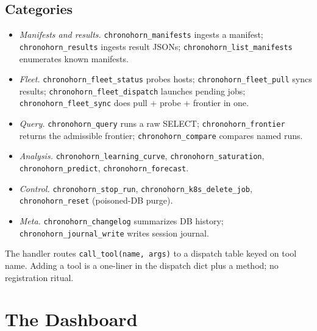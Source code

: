 \documentclass[11pt,openany]{book}
\theoremstyle{definition}
\theoremstyle{plain}
\begin{document}
\section{Categories}

\begin{itemize}
  \item \emph{Manifests and results.}
    \texttt{chronohorn\_manifests} ingests a manifest;
    \texttt{chronohorn\_results} ingests result JSONs;
    \texttt{chronohorn\_list\_manifests} enumerates known manifests.
  \item \emph{Fleet.}
    \texttt{chronohorn\_fleet\_status} probes hosts;
    \texttt{chronohorn\_fleet\_pull} syncs results;
    \texttt{chronohorn\_fleet\_dispatch} launches pending jobs;
    \texttt{chronohorn\_fleet\_sync} does pull + probe + frontier in one.
  \item \emph{Query.}
    \texttt{chronohorn\_query} runs a raw SELECT;
    \texttt{chronohorn\_frontier} returns the admissible frontier;
    \texttt{chronohorn\_compare} compares named runs.
  \item \emph{Analysis.}
    \texttt{chronohorn\_learning\_curve},
    \texttt{chronohorn\_saturation},
    \texttt{chronohorn\_predict},
    \texttt{chronohorn\_forecast}.
  \item \emph{Control.}
    \texttt{chronohorn\_stop\_run},
    \texttt{chronohorn\_k8s\_delete\_job},
    \texttt{chronohorn\_reset} (poisoned-DB purge).
  \item \emph{Meta.}
    \texttt{chronohorn\_changelog} summarizes DB history;
    \texttt{chronohorn\_journal\_write} writes session journal.
\end{itemize}

The handler routes \texttt{call\_tool(name, args)} to a dispatch table
keyed on tool name. Adding a tool is a one-liner in the dispatch dict
plus a method; no registration ritual.

\chapter{The Dashboard}
\label{ch:dashboard}
\end{document}

